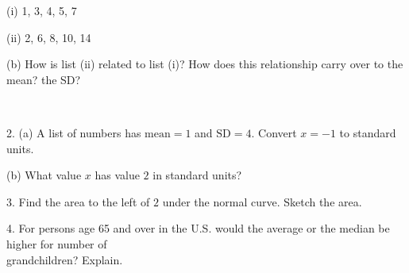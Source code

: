 \documentclass[10pt]{article}
\begin{document}
\hspace{20pt} (i) 1, 3, 4, 5, 7\vspace{2.5in}

\hspace{20pt} (ii) 2, 6, 8, 10, 14\vspace{2.5in}

\hphantom{1. } (b) How is list (ii) related to list (i)?  How does this
relationship carry over to the mean?  the SD?

\vfill
\eject
{\ }

2. (a) A list of numbers has $\mbox{mean}=1$ and $\mbox{SD}=4$.
Convert $x=-1$ to standard units.
\vspace{1.5in}

\hphantom{2. } (b) What value $x$ has value $2$ in standard units?
\vspace{1.5in}

3. Find the area to the left of $2$ under the normal curve.  Sketch the area.
\vspace{3.5in}

4. For persons age 65 and over in the U.S. would the average or the median be 
higher for number of\\\hphantom{4. }grandchildren? Explain.
\vfill
\eject
\end{document}
